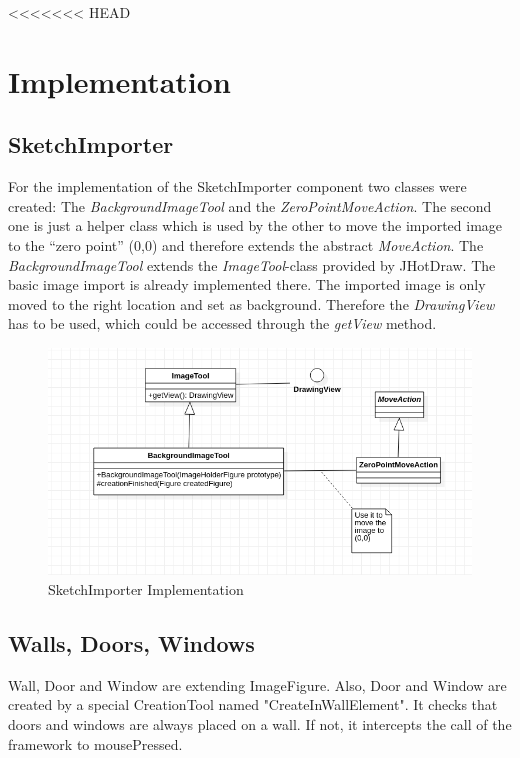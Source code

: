 <<<<<<< HEAD
\section{Implementation}

\subsection{SketchImporter}

For the implementation of the SketchImporter component two classes were created: The \textit{BackgroundImageTool} and the \textit{ZeroPointMoveAction}. The second one is just a helper class which is used by the other to move the imported image to the "`zero point"' (0,0) and therefore extends the abstract \textit{MoveAction}.
The \textit{BackgroundImageTool} extends the \textit{ImageTool}-class provided by JHotDraw. The basic image import is already implemented there. The imported image is only moved to the right location and set as background. Therefore the \textit{DrawingView} has to be used, which could be accessed through the \textit{getView} method.

\begin{figure}[h]
    \includegraphics[keepaspectratio,width=\textwidth]{images/SketchImporter.png}
    \caption{SketchImporter Implementation}
\end{figure}

\subsection{Walls, Doors, Windows}

Wall, Door and Window are extending ImageFigure.
Also, Door and Window are created by a special CreationTool named "CreateInWallElement".
It checks that doors and windows are always placed on a wall.
If not, it intercepts the call of the framework to mousePressed.
